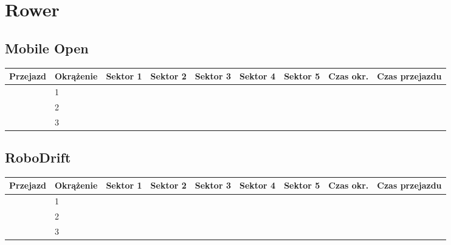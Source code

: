 \documentclass[11pt]{article}
\begin{document}
\section{Rower}
\subsection{Mobile Open}
\begin{table}[h]
\begin{tabular}{|l|l|l|l|l|l|l|l|l|}
\hline
   Przejazd        & Okrążenie & Sektor 1 & Sektor 2 & Sektor 3 & Sektor 4 & Sektor 5 & Czas okr. & Czas przejazdu    \\ \hline
\multirow{3}{*}{} & 1         &          &          &          &          &          &           & \multirow{3}{*}{} \\ \cline{2-8}
                   & 2         &          &          &          &          &          &           &                  \\ \cline{2-8}
                   & 3         &          &          &          &          &          &           &                   \\ \hline
\end{tabular}
\end{table}
\subsection{RoboDrift}
\begin{table}[h]
\begin{tabular}{|l|l|l|l|l|l|l|l|l|}
\hline
   Przejazd        & Okrążenie & Sektor 1 & Sektor 2 & Sektor 3 & Sektor 4 & Sektor 5 & Czas okr. & Czas przejazdu    \\ \hline
\multirow{3}{*}{} & 1         &          &          &          &          &          &           & \multirow{3}{*}{} \\ \cline{2-8}
                   & 2         &          &          &          &          &          &           &                  \\ \cline{2-8}
                   & 3         &          &          &          &          &          &           &                   \\ \hline
\end{tabular}
\end{table}
\end{document}
